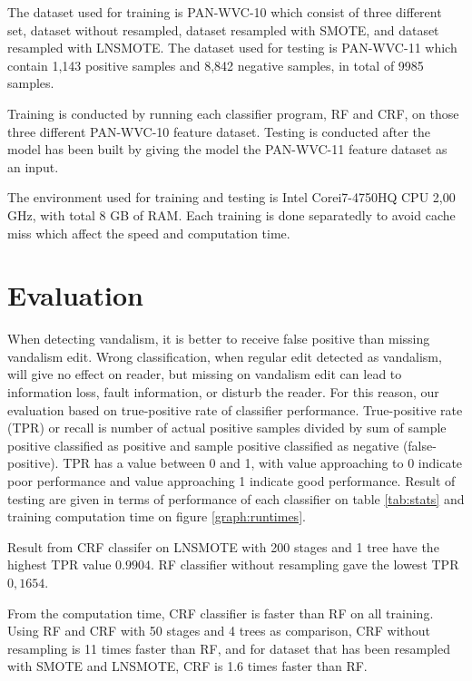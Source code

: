 \documentclass[conference,compsoc,a4paper,twocolumn,final]{IEEEtran}
\begin{document}
The dataset used for training is PAN-WVC-10 which consist of three different
set, dataset without resampled, dataset resampled with SMOTE, and dataset
resampled with LNSMOTE.
The dataset used for testing is PAN-WVC-11 which contain 1,143 positive
samples and 8,842 negative samples, in total of 9985 samples.

Training is conducted by running each classifier program, RF and CRF, on
those three different PAN-WVC-10 feature dataset.
Testing is conducted after the model has been built by giving the model the
PAN-WVC-11 feature dataset as an input.



The environment used for training and testing is Intel\textregistered
Core\texttrademark i7-4750HQ CPU 2,00 GHz, with total 8 GB of RAM.
Each training is done separatedly to avoid cache miss which affect the speed
and computation time.


\section{Evaluation}
\label{section:result_and_analysis}

When detecting vandalism, it is better to receive false positive than missing
vandalism edit.
Wrong classification, when regular edit detected as vandalism, will give no
effect on reader, but missing on vandalism edit can lead to information loss,
fault information, or disturb the reader.
For this reason, our evaluation based on true-positive rate of classifier
performance.
True-positive rate (TPR) or recall is number of actual positive samples divided
by sum of sample positive classified as positive and sample positive classified
as negative (false-positive).
TPR has a value between 0 and 1, with value approaching to 0 indicate poor
performance and value approaching 1 indicate good performance.
Result of testing are given in terms of performance of each classifier on table
\ref{tab:stats} and training computation time on figure \ref{graph:runtimes}.

Result from CRF classifer on LNSMOTE with 200 stages and 1 tree have the
highest TPR value $0.9904$.
RF classifier without resampling gave the lowest TPR $0,1654$.

From the computation time, CRF classifier is faster than RF on all training.
Using RF and CRF with 50 stages and 4 trees as comparison, CRF without
resampling is 11 times faster than RF, and for dataset that has been resampled
with SMOTE and LNSMOTE, CRF is 1.6 times faster than RF.
\end{document}
